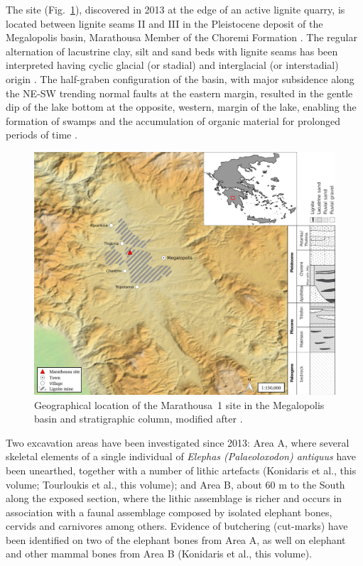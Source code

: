 \documentclass[review,authoryear,times]{elsarticle} %
\begin{document}
The site (Fig.~\ref{fig:1}), discovered in 2013 at the edge of an active lignite quarry, is located between lignite seams II and III in the Pleistocene deposit of the Megalopolis basin, Marathousa Member of the Choremi Formation \citep{Vugt2000}. The regular alternation of lacustrine clay, silt and sand beds with lignite seams has been interpreted having cyclic glacial (or stadial) and interglacial (or interstadial) origin \citep{Nickel1996}. The half-graben configuration of the basin, with major subsidence along the NE-SW trending normal faults at the eastern margin, resulted in the gentle dip of the lake bottom at the opposite, western, margin of the lake, enabling the formation of swamps and the accumulation of organic material for prolonged periods of time \citep{Vugt2000}.

\begin{figure}[]
  \centering
  \includegraphics[width=1\textwidth]{../artwork/Fig1.png} %
  \caption{Geographical location of the Marathousa~1 site in the Megalopolis basin and stratigraphic column, modified after \cite{Vugt2000}.}
  \label{fig:1}
\end{figure}

Two excavation areas have been investigated since 2013: Area A, where several skeletal elements of a single individual of \emph{Elephas (Palaeoloxodon) antiquus} have been unearthed, together with a number of lithic artefacts (Konidaris et al., this volume; Tourloukis et al., this volume); and Area B, about 60 m to the South along the exposed section, where the lithic assemblage is richer and occurs in association with a faunal assemblage composed by isolated elephant bones, cervids and carnivores among others. Evidence of butchering (cut-marks) have been identified on two of the elephant bones from Area A, as well on elephant and other mammal bones from Area B (Konidaris et al., this volume).
\end{document}
